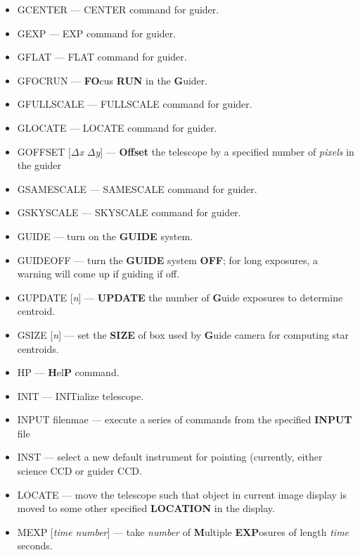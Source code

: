 \begin{itemize}
\item{{GCENTER} --- CENTER command for guider.}
\item{{GEXP} --- EXP command for guider.}
\item{{GFLAT} --- FLAT command for guider.}
\item{{GFOCRUN} --- {\bf FO}cus {\bf RUN} in the {\bf G}uider.}
\item{{GFULLSCALE} --- FULLSCALE command for guider.}
\item{{GLOCATE} --- LOCATE command for guider.}
\item{{GOFFSET [$\Delta${\it x} $\Delta${\it y}]} --- {\bf Offset} the telescope  by a specified number of \textit{pixels} in the guider}
\item{{GSAMESCALE} --- SAMESCALE command for guider.}
\item{{GSKYSCALE} --- SKYSCALE command for guider.}
\item{{GUIDE} --- turn on the {\bf GUIDE} system.}
\item{{GUIDEOFF} --- turn the {\bf GUIDE} system {\bf OFF}; for long exposures, a warning will come up if guiding if off.}
\item{{GUPDATE [{\it n}]} --- {\bf UPDATE} the number of {\bf G}uide exposures to determine centroid.}
\item{{GSIZE [{\it n}]} --- set the {\bf SIZE} of box used by {\bf G}uide camera for computing star centroids.}

\item{{HP} --- {\bf H}el{\bf P} command.}

\item{{INIT} --- INITialize telescope.}
\item{{INPUT} filenmae --- execute a series of commands from the specified
{\bf INPUT} file}
\item{{INST} --- select a new default instrument for pointing (currently, either
science CCD or guider CCD.}

\item{{LOCATE} --- move the telescope such that object in current image display
 is moved to some other specified {\bf LOCATION} in the display.}

\item{{MEXP [{\it time number}]} --- take {\it number} of {\bf M}ultiple 
{\bf EXP}osures of length {\it time} seconds.}


\end{itemize}
